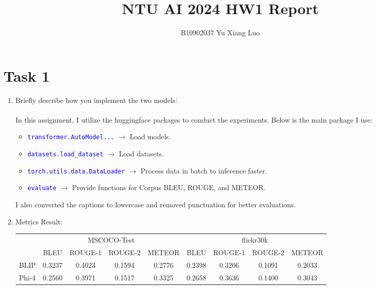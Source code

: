 \documentclass{article}
\title{NTU AI 2024 HW1 Report}
\author{B10902037 Yu Xiang Luo}
\date{}
\begin{document}
\maketitle

\section*{Task 1}

\begin{enumerate}
    \item Briefly describe how you implement the two models: \\
		\\
		In this assignment, I utilize the huggingface packages to conduct the experiments. Below is the main package I use:
        \begin{itemize}
            \item \textcolor{blue}{\texttt{transformer.AutoModel...}} $\rightarrow$ Load models.
            \item \textcolor{blue}{\texttt{datasets.load\_dataset}} $\rightarrow$ Load datasets.
            \item \textcolor{blue}{\texttt{torch.utils.data.DataLoader}} $\rightarrow$ Process data in batch to inference faster.
			\item \textcolor{blue}{\texttt{evaluate}} $\rightarrow$ Provide functions for Corpus BLEU, ROUGE, and METEOR.
        \end{itemize}
		I also converted the captions to lowercase and removed punctuation for better evaluations.\\

    \item Metrics Result:
        \begin{table}[ht]
        \centering
        \begin{tabular}{l cccc cccc}
        \toprule
         & \multicolumn{4}{c}{MSCOCO-Test} & \multicolumn{4}{c}{flickr30k}\\
        \cmidrule(lr){2-5} \cmidrule(lr){6-9}
         & BLEU & ROUGE-1 & ROUGE-2 & METEOR & BLEU & ROUGE-1 & ROUGE-2 & METEOR \\
        \midrule
        BLIP  & 0.3237 & 0.4023 & 0.1594 & 0.2776 & 0.2398 & 0.3206 & 0.1091 & 0.2033 \\
        Phi-4 & 0.2560 & 0.3971 & 0.1517 & 0.3325 & 0.2658 & 0.3636 & 0.1400 & 0.3043 \\
        \bottomrule
        \end{tabular}
        \end{table}


\end{enumerate}
\end{document}
